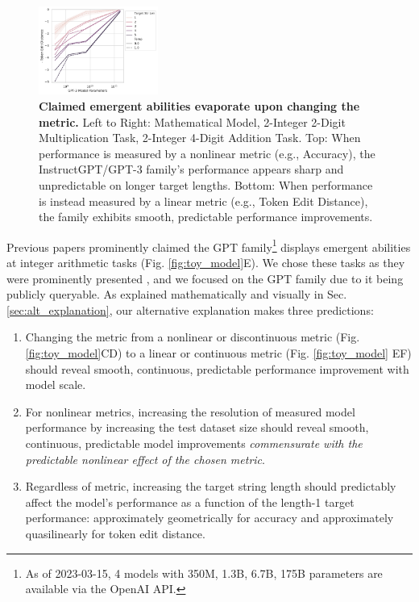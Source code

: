 \begin{figure}
    \includegraphics[width=0.35\textwidth]{figures/gpt3_integer_addition/addition_neg_token_edit_dist_vs_model_size_by_temp_by_target_str_len.pdf}
    \caption{\textbf{Claimed emergent abilities evaporate upon changing the metric.} Left to Right: Mathematical Model, 2-Integer 2-Digit Multiplication Task, 2-Integer 4-Digit Addition Task. Top: When performance is measured by a nonlinear metric (e.g., Accuracy), the InstructGPT/GPT-3 \cite{brown2020language, lowe2022instruct} family's performance appears sharp and unpredictable on longer target lengths. Bottom: When performance is instead measured by a linear metric (e.g., Token Edit Distance), the family exhibits smooth, predictable performance improvements.
    }
    \label{fig:gpt_metric_change}
\end{figure}

Previous papers prominently claimed the GPT \cite{brown2020language,lowe2022instruct} family\footnote{As of 2023-03-15, 4 models with 350M, 1.3B,  6.7B, 175B parameters are available via the OpenAI API.} displays emergent abilities at integer arithmetic tasks \cite{ganguli2022predictability, srivastava2022beyond,wei2022emergent} (Fig. \ref{fig:toy_model}E).
We chose these tasks as they were prominently presented \cite{brown2020language,ganguli2022predictability,srivastava2022beyond,wei2022emergent}, and we focused on the GPT family due to it being publicly queryable.
As explained mathematically and visually in Sec. \ref{sec:alt_explanation}, our alternative explanation makes three predictions:
%
\begin{enumerate}
    \item Changing the metric from a nonlinear or discontinuous metric (Fig. \ref{fig:toy_model}CD) to a linear or continuous metric (Fig. \ref{fig:toy_model} EF) should reveal smooth, continuous, predictable performance improvement with model scale.
    \item For nonlinear metrics, increasing the resolution of measured model performance by increasing the test dataset size should reveal smooth, continuous, predictable model improvements \textit{commensurate with the predictable nonlinear effect of the chosen metric}.
    \item Regardless of metric, increasing the target string length should predictably affect the model's performance as a function of the length-1 target performance: approximately geometrically for accuracy and approximately quasilinearly for token edit distance.
\end{enumerate}

